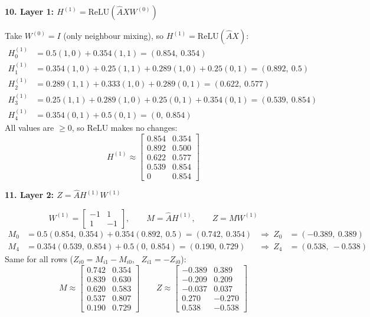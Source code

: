 \documentclass[12pt,a4paper]{article}
\newcommand{\Ahat}{\hat A}
\newcommand{\h}[1]{\par\needspace{6\baselineskip}\medskip\textbf{\large #1}\par}
\begin{document}
\h{10. Layer 1: $H^{(1)} = \mathrm{ReLU}(\Ahat X W^{(0)})$}
Take $W^{(0)} = I$ (only neighbour mixing), so $H^{(1)} = \mathrm{ReLU}(\Ahat X)$:
\begin{align*}
  H^{(1)}_0 &= 0.5(1,0) + 0.354(1,1) = (0.854,\ 0.354)\\
  H^{(1)}_1 &= 0.354(1,0) + 0.25(1,1) + 0.289(1,0) + 0.25(0,1) = (0.892,\ 0.5)\\
  H^{(1)}_2 &= 0.289(1,1) + 0.333(1,0) + 0.289(0,1) = (0.622,\ 0.577)\\
  H^{(1)}_3 &= 0.25(1,1) + 0.289(1,0) + 0.25(0,1) + 0.354(0,1) = (0.539,\ 0.854)\\
  H^{(1)}_4 &= 0.354(0,1) + 0.5(0,1) = (0,\ 0.854)
\end{align*}
All values are $\ge 0$, so ReLU makes no changes:
\[
  H^{(1)} \approx \begin{bmatrix}
  0.854 & 0.354\\ 0.892 & 0.500\\ 0.622 & 0.577\\ 0.539 & 0.854\\ 0 & 0.854
  \end{bmatrix}
\]

\h{11. Layer 2: $Z = \Ahat H^{(1)} W^{(1)}$}
\[
  W^{(1)} = \begin{bmatrix} -1 & 1\\ 1 & -1 \end{bmatrix}, \qquad M = \Ahat H^{(1)}, \qquad Z = M W^{(1)}
\]
\begin{align*}
  M_0 &= 0.5(0.854,\ 0.354) + 0.354(0.892,\ 0.5) = (0.742,\ 0.354) &\Rightarrow\ Z_0 &= (-0.389,\ 0.389)\\
  M_4 &= 0.354(0.539,\ 0.854) + 0.5(0,\ 0.854) = (0.190,\ 0.729) &\Rightarrow\ Z_4 &= (0.538,\ -0.538)
\end{align*}
Same for all rows ($Z_{i0} = M_{i1} - M_{i0}$, \ $Z_{i1} = -Z_{i0}$):
\[
  M \approx \begin{bmatrix}
  0.742 & 0.354\\ 0.839 & 0.630\\ 0.620 & 0.583\\ 0.537 & 0.807\\ 0.190 & 0.729
  \end{bmatrix}
  \qquad
  Z \approx \begin{bmatrix}
  -0.389 & 0.389\\ -0.209 & 0.209\\ -0.037 & 0.037\\ 0.270 & -0.270\\ 0.538 & -0.538
  \end{bmatrix}
\]
\end{document}
